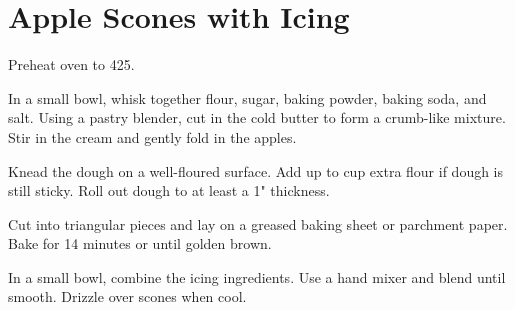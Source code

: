 \section{Apple Scones with Icing}
\begin{recipe}



	Preheat oven to 425.

	In a small bowl, whisk together flour, sugar, baking powder, baking soda, and salt. Using a pastry blender, cut in the cold butter to form a crumb-like mixture. Stir in the cream and gently fold in the apples.

	Knead the dough on a well-floured surface. Add up to  cup extra flour if dough is still sticky. Roll out dough to at least a 1" thickness.

	Cut into triangular pieces and lay on a greased baking sheet or parchment paper. Bake for 14 minutes or until golden brown.

	 In a small bowl, combine the icing ingredients. Use a hand mixer and blend until smooth. Drizzle over scones when cool.

\end{recipe}
